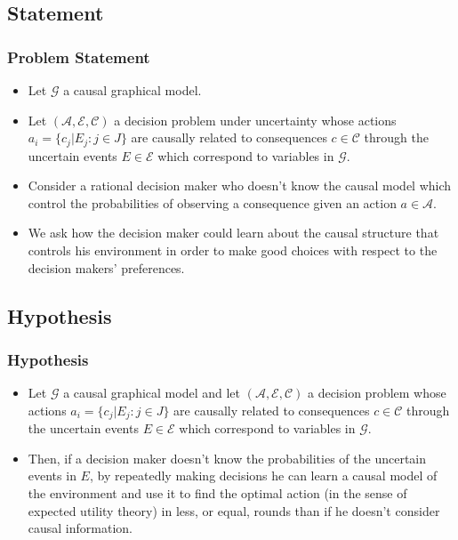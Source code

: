 \documentclass{beamer}
\theoremstyle{plain}
\begin{document}
\subsection{Statement}
	\begin{frame}
	\frametitle{Problem Statement}
	\begin{itemize}
	\item Let  $\mathcal{G}$ a causal graphical model.
	\item Let $(\mathcal{A},\mathcal{E},\mathcal{C})$ a decision problem under uncertainty whose actions $a_i = \{ c_j | E_j : j \in J \}$  are causally related to consequences $c \in \mathcal{C}$ through the uncertain events $E \in \mathcal{E}$ which correspond to variables in $\mathcal{G}$. 
	\item Consider a rational decision maker who doesn't know the causal model which control the probabilities of observing a consequence given an action $a \in \mathcal{A}$.
	\item We ask how the decision maker could learn about the causal structure that controls his environment in order to make good choices with respect to the decision makers' preferences.
	\end{itemize}
	\end{frame}

	\subsection{Hypothesis}
	\begin{frame}
	\frametitle{Hypothesis}
	\begin{itemize}
	\item Let $\mathcal{G}$ a causal graphical model and let $(\mathcal{A},\mathcal{E},\mathcal{C})$ a decision problem whose actions $a_i = \{ c_j | E_j : j \in J \}$  are causally related to consequences $c \in \mathcal{C}$ through the uncertain events $E \in \mathcal{E}$ which correspond to variables in $\mathcal{G}$.
	\item Then, if a decision maker doesn't know the probabilities of the uncertain events in $E$, by repeatedly making decisions he can learn a causal model of the environment and use it to find the optimal action (in the sense of expected utility theory) in less, or equal, rounds than if he doesn't consider causal information.
	\end{itemize}
	\end{frame}
\end{document}
